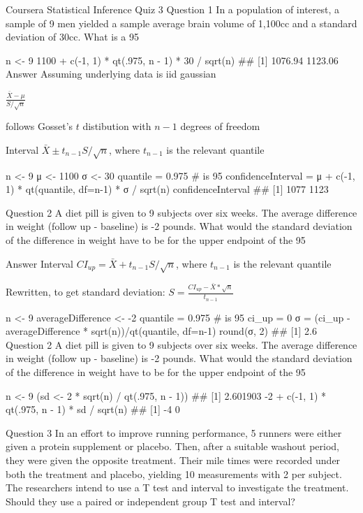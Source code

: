 Coursera Statistical Inference Quiz 3
Question 1
In a population of interest, a sample of 9 men yielded a sample average brain volume of 1,100cc and a standard deviation of 30cc. What is a 95%

n <- 9
1100 + c(-1, 1) * qt(.975, n - 1) * 30 / sqrt(n)
## [1] 1076.94 1123.06
Answer
Assuming underlying data is iid gaussian

\(\frac{\bar X - μ}{S / \sqrt{n}}\)

follows Gosset’s \(t\) distibution with \(n-1\) degrees of freedom

Interval \(\bar X \pm t_{n-1} S / \sqrt{n}\), where \(t_{n-1}\) is the relevant quantile

n <- 9
μ <- 1100
σ <- 30
quantile = 0.975 # is 95%
confidenceInterval = μ + c(-1, 1) * qt(quantile, df=n-1) * σ / sqrt(n)
confidenceInterval
## [1] 1077 1123


Question 2
A diet pill is given to 9 subjects over six weeks. The average difference in weight (follow up - baseline) is -2 pounds. What would the standard deviation of the difference in weight have to be for the upper endpoint of the 95%

Answer
Interval \(CI_{up} = \bar X + t_{n-1} S / \sqrt{n}\), where \(t_{n-1}\) is the relevant quantile

Rewritten, to get standard deviation: \(S = \frac{CI_{up} - \bar X * \sqrt{n}}{t_{n-1}}\)

n <- 9
averageDifference <- -2
quantile = 0.975 # is 95%
ci_up = 0
σ = (ci_up - averageDifference * sqrt(n))/qt(quantile, df=n-1)
round(σ, 2)
## [1] 2.6
Question 2
A diet pill is given to 9 subjects over six weeks. The average difference in weight (follow up - baseline) is -2 pounds. What would the standard deviation of the difference in weight have to be for the upper endpoint of the 95%

n <- 9
(sd <- 2 * sqrt(n) / qt(.975, n - 1))
## [1] 2.601903
-2 + c(-1, 1) * qt(.975, n - 1) * sd / sqrt(n)
## [1] -4  0

Question 3
In an effort to improve running performance, 5 runners were either given a protein supplement or placebo. Then, after a suitable washout period, they were given the opposite treatment. Their mile times were recorded under both the treatment and placebo, yielding 10 measurements with 2 per subject. The researchers intend to use a T test and interval to investigate the treatment. Should they use a paired or independent group T test and interval?

